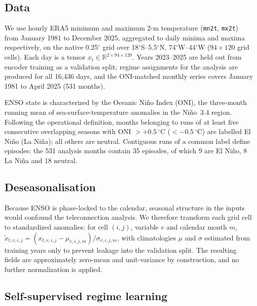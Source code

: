 \documentclass[pdflatex,sn-nature]{sn-jnl}
\begin{document}
\subsection{Data}\label{sec:data}

We use hourly ERA5\cite{hersbach2020era5} minimum and maximum 2-m temperature (\texttt{mn2t}, \texttt{mx2t}) from January 1981 to December 2025, aggregated to daily minima and maxima respectively, on the native 0.25$^\circ$ grid over 18$^\circ$S--5.5$^\circ$N, 74$^\circ$W--44$^\circ$W ($94 \times 120$ grid cells). Each day is a tensor $x_t \in \mathbb{R}^{2 \times 94 \times 120}$. Years 2023--2025 are held out from encoder training as a validation split; regime assignments for the analysis are produced for all 16{,}436 days, and the ONI-matched monthly series covers January 1981 to April 2025 (531 months).

ENSO state is characterized by the Oceanic Ni\~no Index (ONI)\cite{noaa_oni_index,noaa_enso}, the three-month running mean of sea-surface-temperature anomalies in the Ni\~no~3.4 region. Following the operational definition, months belonging to runs of at least five consecutive overlapping seasons with ONI $> +0.5\,^\circ$C ($< -0.5\,^\circ$C) are labelled El Ni\~no (La Ni\~na); all others are neutral. Contiguous runs of a common label define episodes: the 531 analysis months contain 35 episodes, of which 9 are El Ni\~no, 8 La Ni\~na and 18 neutral.

\subsection{Deseasonalisation}\label{sec:deseason}

Because ENSO is phase-locked to the calendar, seasonal structure in the inputs would confound the teleconnection analysis. We therefore transform each grid cell to standardized anomalies: for cell $(i,j)$, variable $v$ and calendar month $m$, $\tilde{x}_{t,v,i,j} = (x_{t,v,i,j} - \mu_{v,i,j,m}) / \sigma_{v,i,j,m}$, with climatologies $\mu$ and $\sigma$ estimated from training years only to prevent leakage into the validation split. The resulting fields are approximately zero-mean and unit-variance by construction, and no further normalization is applied.

\subsection{Self-supervised regime learning}\label{sec:msn}
\end{document}
